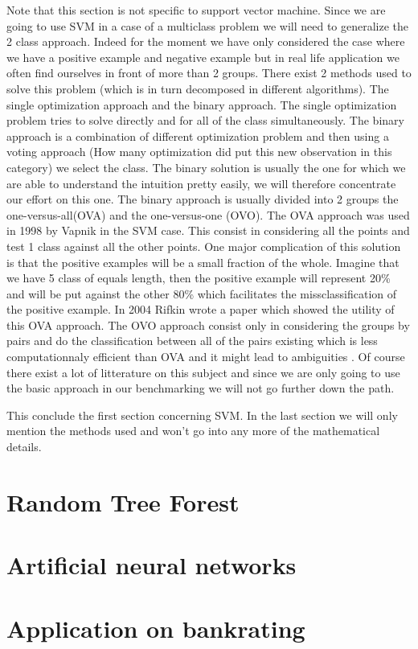 \documentclass[a4paper,11pt]{article}
\numberwithin{equation}{section}
\begin{document}
Note that this section is not specific to support vector machine. Since we are going to use SVM in a case of a multiclass problem we will need to generalize the 2 class approach. Indeed for the moment we have only considered the case where we have a positive example and negative example but in real life application we often find ourselves in front of more than 2 groups. There exist 2 methods used to solve this problem (which is in turn decomposed in different algorithms). The single optimization approach and the binary approach. The single optimization problem tries to solve directly and for all of the class simultaneously. The binary approach is a combination of different optimization problem and then using a voting approach (How many optimization did put this new observation in this category) we select the class. The binary solution is usually the one for which we are able to understand the intuition pretty easily, we will therefore concentrate our effort on this one. The binary approach is usually divided into 2 groups the one-versus-all(OVA) and the one-versus-one (OVO). The OVA approach was used in 1998 by Vapnik in the SVM case. This consist in considering all the points and test 1 class against all the other points. One major complication of this solution is that the positive examples will be a small fraction of the whole. Imagine that we have 5 class of equals length, then the positive example will represent 20\% and will be put against the other 80\% which facilitates the missclassification of the positive example. In 2004 Rifkin \cite{rifkin2004defense} wrote a paper which showed the utility of this OVA approach. The OVO approach consist only in considering the groups by pairs and do the classification between all of the pairs existing which is less computationnaly efficient than OVA and it might lead to ambiguities \cite{Bishop}. Of course there exist a lot of litterature on this subject and since we are only going to use the basic approach in our benchmarking we will not go further down the path.

This conclude the first section concerning SVM. In the last section we will only mention the methods used and won't go into any more of the mathematical details.



\newpage

\section{Random Tree Forest}
\doublespacing



\newpage

\section{Artificial neural networks}
\doublespacing

\newpage

\section{Application on bankrating}
\doublespacing

\newpage
\doublespacing

\nocite{*}



\end{document}
